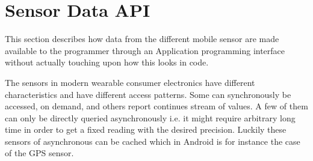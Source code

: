 
\section{Sensor Data API}
\label{sec:sensor_data_api}

This section describes how data from the different mobile sensor are made available to the programmer through an Application programming interface without actually touching upon how this looks in code. 

The sensors in modern wearable consumer electronics have different characteristics and have different access patterns. Some can synchronously be accessed, on demand, and others report continues stream of values. A few of them can only be directly queried asynchronously i.e. it might require arbitrary long time in order to get a fixed reading with the desired precision. Luckily these sensors of asynchronous can be cached which in Android is for instance the case of the GPS sensor.   